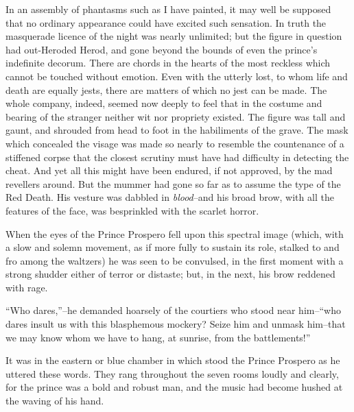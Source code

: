 \documentclass[smalldemyvopaper,14pt,twoside,onecolumn,openright,extrafontsizes,showtrims]{memoir}
\begin{document}
In an assembly of phantasms such as I have painted, it may well be supposed that no ordinary appearance could have excited such sensation. In truth the masquerade licence of the night was nearly unlimited; but the figure in question had out-Heroded Herod, and gone beyond the bounds of even the prince's indefinite decorum. There are chords in the hearts of the most reckless which cannot be touched without emotion. Even with the utterly lost, to whom life and death are equally jests, there are matters of which no jest can be made. The whole company, indeed, seemed now deeply to feel that in the costume and bearing of the stranger neither wit nor propriety existed. The figure was tall and gaunt, and shrouded from head to foot in the habiliments of the grave. The mask which concealed the visage was made so nearly to resemble the countenance of a stiffened corpse that the closest scrutiny must have had difficulty in detecting the cheat. And yet all this might have been endured, if not approved, by the mad revellers around. But the mummer had gone so far as to assume the type of the Red Death. His vesture was dabbled in \textit{blood}--and his broad brow, with all the features of the face, was besprinkled with the scarlet horror.

When the eyes of the Prince Prospero fell upon this spectral image (which, with a slow and solemn movement, as if more fully to sustain its role, stalked to and fro among the waltzers) he was seen to be convulsed, in the first moment with a strong shudder either of terror or distaste; but, in the next, his brow reddened with rage.

``Who dares,''--he demanded hoarsely of the courtiers who stood near him--``who dares insult us with this blasphemous mockery? Seize him and unmask him--that we may know whom we have to hang, at sunrise, from the battlements!''

It was in the eastern or blue chamber in which stood the Prince Prospero as he uttered these words. They rang throughout the seven rooms loudly and clearly, for the prince was a bold and robust man, and the music had become hushed at the waving of his hand.
\end{document}
